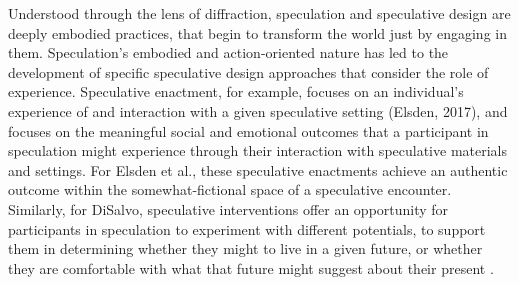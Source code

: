 Understood through the lens of diffraction, speculation and speculative design are deeply embodied practices, that begin to transform the world just by engaging in them. Speculation's embodied and action-oriented nature has led to the development of specific speculative design approaches that consider the role of experience. Speculative enactment, for example, focuses on an individual's experience of and interaction with a given speculative setting (Elsden, 2017), and focuses on the meaningful social and emotional outcomes that a participant in speculation might experience through their interaction with speculative materials and settings. For Elsden et al., these speculative enactments achieve an authentic outcome within the somewhat-fictional space of a speculative encounter. Similarly, for DiSalvo, speculative interventions offer an opportunity for participants in speculation to experiment with different potentials, to support them in determining whether they might to live in a given future, or whether they are comfortable with what that future might suggest about their present \cite[140]{disalvo_irony_2016}.